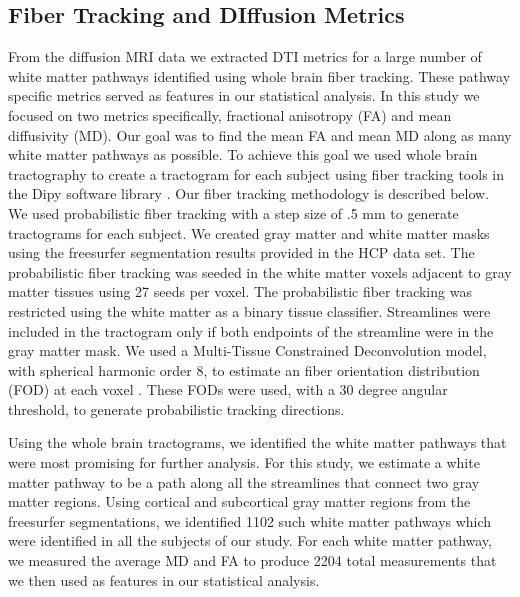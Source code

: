 \subsection{Fiber Tracking and DIffusion Metrics}
    From the diffusion MRI data we extracted DTI metrics for a large number of white matter pathways identified using whole brain fiber tracking. These pathway specific metrics served as features in our statistical analysis. In this study we focused on two metrics specifically, fractional anisotropy (FA) and mean diffusivity (MD). Our goal was to find the mean FA and mean MD along as many white matter pathways as possible. To achieve this goal we used whole brain tractography to create a tractogram for each subject using fiber tracking tools in the Dipy software library \cite{Garyfallidis_2014}. Our fiber tracking methodology is described below. 
We used probabilistic fiber tracking with a step size of .5 mm to generate tractograms for each subject. We created gray matter and white matter masks using the freesurfer segmentation results provided in the HCP data set. The probabilistic fiber tracking was seeded in the white matter voxels adjacent to gray matter tissues using 27 seeds per voxel. The probabilistic fiber tracking was restricted using the white matter as a binary tissue classifier. Streamlines were included in the tractogram only if both endpoints of the streamline were in the gray matter mask. We used a Multi-Tissue Constrained Deconvolution model, with spherical harmonic order 8, to estimate an fiber orientation distribution (FOD) at each voxel \cite{Jeurissen_2014}. These FODs were used, with a 30 degree angular threshold, to generate probabilistic tracking directions.

    Using the whole brain tractograms, we identified the white matter pathways that were most promising for further analysis. For this study, we estimate a white matter pathway to be a path along all the streamlines that connect two gray matter regions. Using cortical and subcortical gray matter regions from the freesurfer segmentations, we identified 1102 such white matter pathways which were identified in all the subjects of our study. For each white matter pathway, we measured the average MD and FA to produce 2204 total measurements that we then used as features in our statistical analysis.
    
